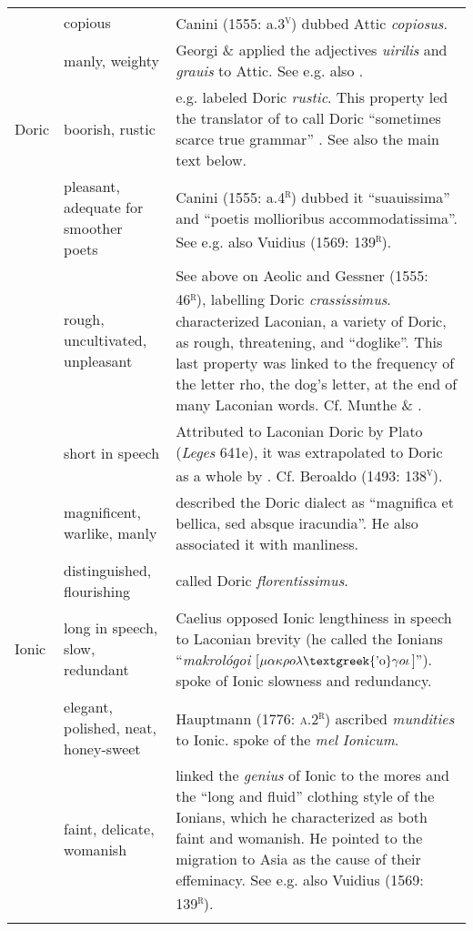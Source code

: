 \documentclass[output=paper]{langsci/langscibook}
\begin{document}
\begin{tabularx}{\textwidth}{XXX}
& copious & Canini (1555: a.3\textsc{\textsuperscript{v}}) dubbed Attic \textit{copiosus}.\\
\hhline{~--} & manly, weighty & Georgi \& \citet[6]{Graun1729} applied the adjectives \textit{uirilis} and \textit{grauis} to Attic. See e.g. also \citet[515]{Fabricius1711}.\\
\multicolumn{1}{X}{Doric} & boorish, rustic & \citet[317]{Bentley1699} e.g. labeled Doric \textit{rustic}. This property led the translator of \citet[117]{Rapin1659} to call Doric “sometimes scarce true grammar” \citep[31]{Rapin1684}. See also the main text below.\\
& pleasant, adequate for smoother poets & Canini (1555: a.4\textsc{\textsuperscript{r}}) dubbed it “suauissima” and “poetis mollioribus accommodatissima”. See e.g. also Vuidius (1569: 139\textsc{\textsuperscript{r}}).\\
\hhline{~--} & rough, uncultivated, unpleasant & See above on Aeolic and Gessner (1555: 46\textsc{\textsuperscript{r}}), labelling Doric \textit{crassissimus}. \citet[54]{Vossius1673} characterized Laconian, a variety of Doric, as rough, threatening, and “doglike”. This last property was linked to the frequency of the letter rho, the dog’s letter, at the end of many Laconian words. Cf. Munthe \& \citet[24]{Heiberg1748}.\\
\hhline{~--} & short in speech & Attributed to Laconian Doric by Plato (\textit{Leges} 641e), it was extrapolated to Doric as a whole by \citet[393]{Saumaise1643a}. Cf. Beroaldo (1493: 138\textsc{\textsuperscript{v}}).\\
\hhline{~--} & magnificent, warlike, manly & \citet[55]{Vossius1673} described the Doric dialect as “magnifica et bellica, sed absque iracundia”. He also associated it with manliness.\\
\hhline{~--} & distinguished, flourishing & \citet[161]{Gesner1774} called Doric \textit{florentissimus}.\\
\multicolumn{1}{X}{Ionic} & long in speech, slow, redundant & Caelius \citet[677]{Rhodiginus1542} opposed Ionic lengthiness in speech to Laconian brevity (he called the Ionians “\textit{makrológoi} [$\mu \alpha \kappa \rho o\lambda \text{\textgreek{'o}}\gamma o\iota $]”). \citet[75]{Saumaise1643a} spoke of Ionic slowness and redundancy.\\
& elegant, polished, neat, honey-sweet & Hauptmann (1776: \textsc{a.2}\textsc{\textsuperscript{r}}) ascribed \textit{mundities} to Ionic. \citet[290]{Verwey1684} spoke of the \textit{mel} \textit{Ionicum}.\\
\hhline{~--} & faint, delicate, womanish & \citet[75]{Saumaise1643a} linked the \textit{genius} of Ionic to the mores and the “long and fluid” clothing style of the Ionians, which he characterized as both faint and womanish. He pointed to the migration to Asia as the cause of their effeminacy. See e.g. also Vuidius (1569: 139\textsc{\textsuperscript{r}}).\\
\hhline{~--}
\lspbottomrule
\end{tabularx}
\end{document}
